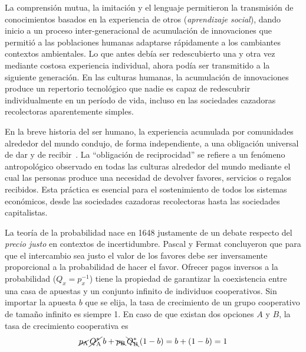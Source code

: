 \documentclass[a4paper,11pt]{book}
\theoremstyle{definition}
\begin{document}

La comprensión mutua, la imitación y el lenguaje permitieron la transmisión de conocimientos basados en la experiencia de otros (\emph{aprendizaje social}), dando inicio a un proceso inter-generacional de acumulación de innovaciones que permitió a las poblaciones humanas adaptarse rápidamente a los cambiantes contextos ambientales.
%
Lo que antes debía ser redescubierto una y otra vez mediante costosa experiencia individual, ahora podía ser transmitido a la siguiente generación.
%
En las culturas humanas, la acumulación de innovaciones produce un repertorio tecnológico que nadie es capaz de redescubrir individualmente en un período de vida, incluso en las sociedades cazadoras recolectoras aparentemente simples.


En la breve historia del ser humano, la experiencia acumulada por comunidades alrededor del mundo condujo, de forma independiente, a una obligación universal de dar y de recibir~\cite{mauss1923-leDon}.
%
La ``obligación de reciprocidad'' se refiere a un fenómeno antropológico observado en todas las culturas alrededor del mundo mediante el cual las personas produce una necesidad de devolver favores, servicios o regalos recibidos.
%
Esta práctica es esencial para el sostenimiento de todos los sistemas económicos, desde las sociedades cazadoras recolectoras hasta las sociedades capitalistas.


La teoría de la probabilidad nace en 1648 justamente de un debate respecto del \emph{precio justo} en contextos de incertidumbre.
%
Pascal y Fermat concluyeron que para que el intercambio sea justo el valor de los favores debe ser inversamente proporcional a la probabilidad de hacer el favor.
%
Ofrecer pagos inversos a la probabilidad ($Q_x = p_x^{-1}$) tiene la propiedad de garantizar la coexistencia entre una casa de apuestas y un conjunto infinito de individuos cooperativos.
%
Sin importar la apuesta $b$ que se elija, la tasa de crecimiento de un grupo cooperativo de tamaño infinito es siempre 1.
%
En caso de que existan dos opciones $A$ y $B$, la tasa de crecimiento cooperativa es
\begin{equation}
\cancel{p_{\text{A}}} \,  \cancel{Q^*_{\text{A}}} \, b + \bcancel{p_{\text{B}}} \, \bcancel{Q^*_{\text{B}}}  \, (1-b) = b + (1-b)  = 1
\end{equation}
\end{document}
